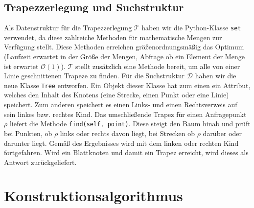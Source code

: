 \documentclass[11pt, a4paper]{article}
\newcommand{\T}{\ensuremath{\mathcal{T}} }
\newcommand{\D}{\ensuremath{\mathcal{D}} }
\begin{document}
\subsection{Trapezzerlegung und Suchstruktur}

Als Datenstruktur für die Trapezzerlegung \T haben wir die Python-Klasse \texttt{set} verwendet, da diese zahlreiche Methoden für mathematische Mengen zur Verfügung stellt. Diese Methoden erreichen größenordnungsmäßig das Optimum (Laufzeit erwartet in der Größe der Mengen, Abfrage ob ein Element der Menge ist erwartet $\mathcal{O}(1)$). \T stellt zusätzlich eine Methode bereit, um alle von einer Linie geschnittenen Trapeze zu finden.
Für die Suchstruktur \D haben wir die neue Klasse \texttt{Tree} entworfen. Ein Objekt dieser Klasse hat zum einen ein Attribut, welches den Inhalt des Knotens (eine Strecke, einen Punkt oder eine Linie) speichert. Zum anderen speichert es einen Links- und einen Rechtsverweis auf sein linkes bzw. rechtes Kind. Das umschließende Trapez für einen Anfragepunkt $\rho$ liefert die Methode \texttt{find(self, point)}. Diese steigt den Baum hinab und prüft bei Punkten, ob $\rho$ links oder rechts davon liegt, bei Strecken ob $\rho$ darüber oder darunter liegt. Gemäß des Ergebnisses wird mit dem linken oder rechten Kind fortgefahren. Wird ein Blattknoten und damit ein Trapez erreicht, wird dieses als Antwort zurückgeliefert.

\section{Konstruktionsalgorithmus}
\end{document}
